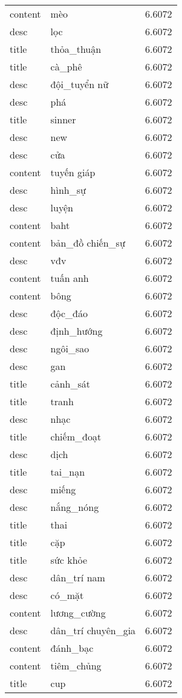 \documentclass{article}
\begin{document}
\begin{tabular}{lll}
content & mèo & 6.6072\\
desc & lọc & 6.6072\\
title & thỏa\_thuận & 6.6072\\
title & cà\_phê & 6.6072\\
desc & đội\_tuyển nữ & 6.6072\\
desc & phá & 6.6072\\
title & sinner & 6.6072\\
desc & new & 6.6072\\
desc & cửa & 6.6072\\
content & tuyến giáp & 6.6072\\
desc & hình\_sự & 6.6072\\
desc & luyện & 6.6072\\
content & baht & 6.6072\\
content & bản\_đồ chiến\_sự & 6.6072\\
desc & vđv & 6.6072\\
content & tuấn anh & 6.6072\\
content & bông & 6.6072\\
desc & độc\_đáo & 6.6072\\
desc & định\_hướng & 6.6072\\
desc & ngôi\_sao & 6.6072\\
desc & gan & 6.6072\\
title & cảnh\_sát & 6.6072\\
title & tranh & 6.6072\\
desc & nhạc & 6.6072\\
title & chiếm\_đoạt & 6.6072\\
desc & dịch & 6.6072\\
title & tai\_nạn & 6.6072\\
desc & miếng & 6.6072\\
desc & nắng\_nóng & 6.6072\\
title & thai & 6.6072\\
title & cặp & 6.6072\\
title & sức khỏe & 6.6072\\
desc & dân\_trí nam & 6.6072\\
desc & có\_mặt & 6.6072\\
content & lương\_cường & 6.6072\\
desc & dân\_trí chuyên\_gia & 6.6072\\
content & đánh\_bạc & 6.6072\\
content & tiêm\_chủng & 6.6072\\
title & cup & 6.6072\\

\end{tabular}
\end{document}
